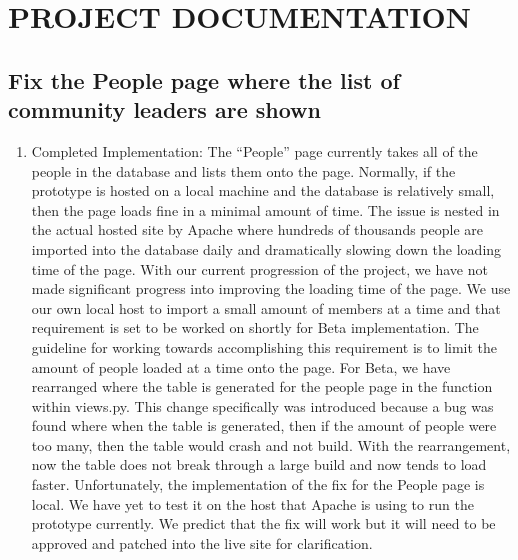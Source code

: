 \documentclass[draftclsnofoot,10pt,onecolumn]{IEEEtran} %
\begin{document}






\section{PROJECT DOCUMENTATION}

\subsection{Fix the People page where the list of community leaders are shown}
\begin{enumerate}
  \item Completed Implementation: The “People” page currently takes all of the
    people in the database and lists them onto the page. Normally, if the
    prototype is hosted on a local machine and the database is relatively small,
    then the page loads fine in a minimal amount of time. The issue is nested in
    the actual hosted site by Apache where hundreds of thousands people are
    imported into the database daily and dramatically slowing down the loading
    time of the page.  With our current progression of the project, we have not
    made significant progress into improving the loading time of the page. We
    use our own local host to import a small amount of members at a time and
    that requirement is set to be worked on shortly for Beta implementation. The
    guideline for working towards accomplishing this requirement is to limit the
    amount of people loaded at a time onto the page. For Beta, we have
    rearranged where the table is generated for the people page in the function
    within views.py. This change specifically was introduced because a bug was
    found where when the table is generated, then if the amount of people were
    too many, then the table would crash and not build. With the rearrangement,
    now the table does not break through a large build and now tends to load
    faster. Unfortunately, the implementation of the fix for the People page is
    local. We have yet to test it on the host that Apache is using to run the
    prototype currently. We predict that the fix will work but it will need to
    be approved and patched into the live site for clarification.
\end{enumerate}
\end{document}
